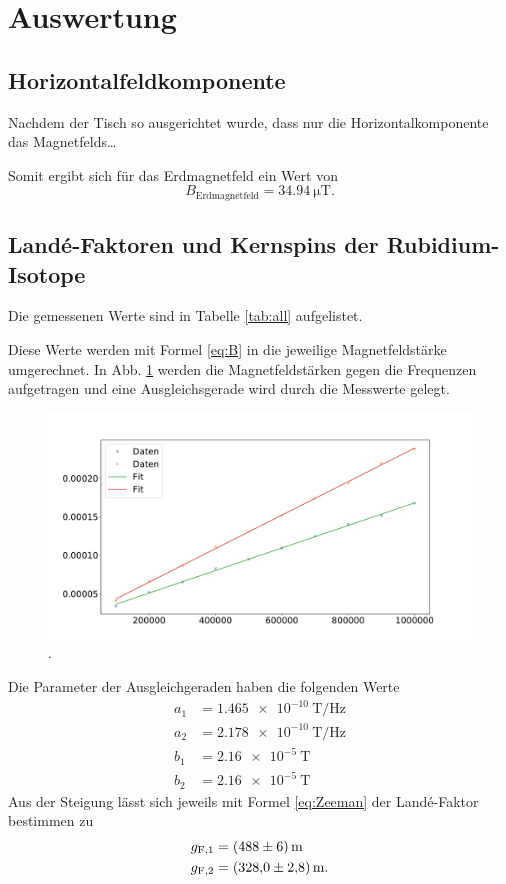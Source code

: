 \section{Auswertung}
\label{sec:Auswertung}

\subsection{Horizontalfeldkomponente}

Nachdem der Tisch so ausgerichtet wurde, dass nur die Horizontalkomponente das Magnetfelds\dots 

Somit ergibt sich für das Erdmagnetfeld ein Wert von 
\begin{equation*}
    B_\text{Erdmagnetfeld} = \SI{34.94}{\micro\tesla}.
\end{equation*}

\subsection{Landé-Faktoren und Kernspins der Rubidium-Isotope} 

Die gemessenen Werte sind in Tabelle \ref{tab:all}
aufgelistet.


Diese Werte werden mit Formel \eqref{eq:B} in die jeweilige Magnetfeldstärke umgerechnet. %
In Abb. \ref{fig:plot} werden die Magnetfeldstärken gegen die Frequenzen aufgetragen und eine Ausgleichsgerade wird durch die Messwerte gelegt. 
\begin{figure}
    \centering
    \includegraphics[width=15cm]{plots/fits.pdf}
    \caption{.}
    \label{fig:plot}
\end{figure}

Die Parameter der Ausgleichgeraden haben die folgenden Werte
\begin{align*}
    a_1 &= \SI{1.465e-10}{\tesla\per\hertz} \\ %
    a_2 &= \SI{2.178e-10}{\tesla\per\hertz} \\
    b_1 &= \SI{2.16e-5}{\tesla} \\
    b_2 &= \SI{2.16e-5}{\tesla}
\end{align*}
Aus der Steigung lässt sich jeweils mit Formel \ref{eq:Zeeman} der Landé-Faktor bestimmen zu
\begin{align*}
    g_{\text{F},1} &= \SI{488 \pm 6}{\meter} \\
    g_{\text{F},2} &= \SI{328 \pm 2.8}{\meter}.
\end{align*}

